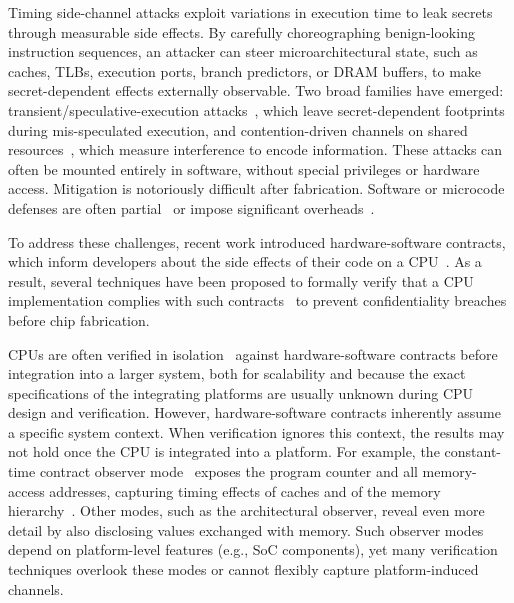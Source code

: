 
Timing side-channel attacks exploit variations in execution time to leak secrets through measurable side effects.
By carefully choreographing benign-looking instruction sequences, an attacker can steer microarchitectural state, such as caches, TLBs, execution ports, branch predictors, or DRAM buffers, to make secret-dependent effects externally observable.
Two broad families have emerged: transient/speculative-execution attacks~\cite{kocher2019spectre,lipp2018meltdown,canella2019fallout,schwarz2019zombieload,van2019ridl,van2021cacheout,ragab2021rage,wikner2022retbleed,trujillo2023inception,wikner2023phantom,wikner2024breaking,wikner2025bpi}, which leave secret-dependent footprints during mis-speculated execution, and contention-driven channels on shared resources~\cite{bernstein2005cache,Liu2015LLC,YaromFalkner2014FlushReload,Yarom2016CacheBleed,Moghimi2018MemJam,Gruss2016PrefetchSCA,Pessl2016DRAMA}, which measure interference to encode information.
These attacks can often be mounted entirely in software, without special privileges or hardware access.
Mitigation is notoriously difficult after fabrication.
Software or microcode defenses are often partial~\cite{ridlad} or impose significant overheads~\cite{herzog2021price}.

To address these challenges, recent work introduced hardware-software contracts, which inform developers about the side effects of their code on a CPU~\cite{guarnieri2021hardware,oleksenko2022revizor}.
As a result, several techniques have been proposed to formally verify that a CPU implementation complies with such contracts~\cite{dinesh2024conjunct,dinesh2025h,ceesay2024mucfi,wang2023specification,tan2025contractshadowlogic,hsiao2024rtl2mmupath} to prevent confidentiality breaches before chip fabrication.

CPUs are often verified in isolation~\cite{dinesh2024conjunct,dinesh2025h,ceesay2024mucfi,wang2023specification,tan2025contractshadowlogic,hsiao2024rtl2mmupath} against hardware-software contracts before integration into a larger system, both for scalability and because the exact specifications of the integrating platforms are usually unknown during CPU design and verification.
However, hardware-software contracts inherently assume a specific system context. When verification ignores this context, the results may not hold once the CPU is integrated into a platform.
For example, the constant-time contract observer mode~\cite{guarnieri2021hardware} exposes the program counter and all memory-access addresses, capturing timing effects of caches and of the memory hierarchy~\cite{guarnieri2021hardware,oleksenko2022revizor}.
Other modes, such as the architectural observer, reveal even more detail by also disclosing values exchanged with memory.
Such observer modes depend on platform-level features (e.g., SoC components), yet many verification techniques overlook these modes or cannot flexibly capture platform-induced channels.

